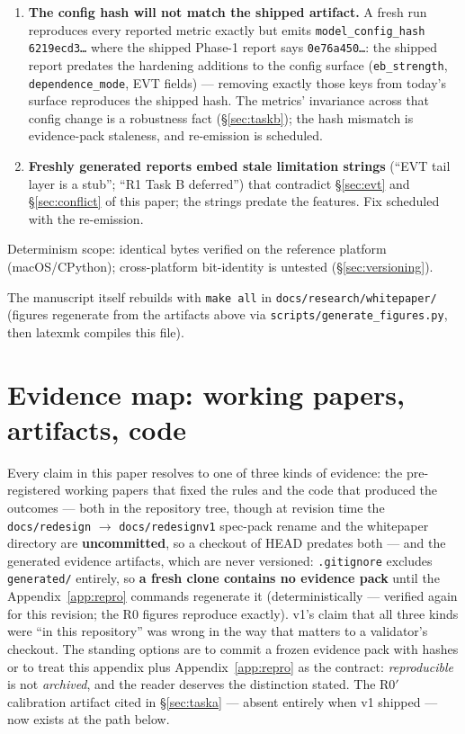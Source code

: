 \documentclass[11pt]{article}
\begin{document}
\begin{enumerate}[leftmargin=1.6em]
\item \textbf{The config hash will not match the shipped artifact.} A fresh
  run reproduces every reported metric exactly but emits
  \texttt{model\_config\_hash 6219ecd3\ldots} where the shipped Phase-1
  report says \texttt{0e76a450\ldots}: the shipped report predates the
  hardening additions to the config surface (\texttt{eb\_strength},
  \texttt{dependence\_mode}, EVT fields) --- removing exactly those keys
  from today's surface reproduces the shipped hash. The metrics' invariance
  across that config change is a robustness fact (\S\ref{sec:taskb}); the
  hash mismatch is evidence-pack staleness, and re-emission is scheduled.
\item \textbf{Freshly generated reports embed stale limitation strings}
  (``EVT tail layer is a stub''; ``R1 Task B deferred'') that contradict
  \S\ref{sec:evt} and \S\ref{sec:conflict} of this paper; the strings
  predate the features. Fix scheduled with the re-emission.
\end{enumerate}

Determinism scope: identical bytes verified on the reference platform
(macOS/CPython); cross-platform bit-identity is untested
(\S\ref{sec:versioning}).

The manuscript itself rebuilds with \texttt{make all} in
\texttt{docs/research/whitepaper/} (figures regenerate from the artifacts above via
\texttt{scripts/generate\_figures.py}, then latexmk compiles this file).

\section{Evidence map: working papers, artifacts, code}
\label{app:evidence}

Every claim in this paper resolves to one of three kinds of evidence: the
pre-registered working papers that fixed the rules and the code that
produced the outcomes --- both in the repository tree, though at revision
time the \texttt{docs/redesign} $\to$ \texttt{docs/redesignv1} spec-pack
rename and the whitepaper directory are \textbf{uncommitted}, so a checkout
of HEAD predates both --- and the generated evidence artifacts, which are
never versioned: \texttt{.gitignore} excludes \texttt{generated/} entirely,
so \textbf{a fresh clone contains no evidence pack} until the
Appendix~\ref{app:repro} commands regenerate it (deterministically ---
verified again for this revision; the R0 figures reproduce exactly). v1's
claim that all three kinds were ``in this repository'' was wrong in the way
that matters to a validator's checkout. The standing options are to commit a
frozen evidence pack with hashes or to treat this appendix plus
Appendix~\ref{app:repro} as the contract: \emph{reproducible} is not
\emph{archived}, and the reader deserves the distinction stated. The R0$'$
calibration artifact cited in \S\ref{sec:taska} --- absent entirely when v1
shipped --- now exists at the path below.
\end{document}
